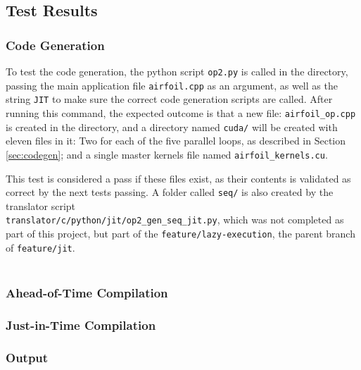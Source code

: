 \subsection{Test Results}

\subsubsection{Code Generation}
To test the code generation, the python script \verb|op2.py| is called in the directory, passing the main application file \verb|airfoil.cpp| as an argument, as well as the string \verb|JIT| to make sure the correct code generation scripts are called.
\noindent After running this command, the expected outcome is that a new file: \verb|airfoil_op.cpp| is created in the directory, and a directory named \verb|cuda/| will be created with eleven files in it: Two for each of the five parallel loops, as described in Section \ref{sec:codegen}; and a single master kernels file named \verb|airfoil_kernels.cu|.
\par
This test is considered a pass if these files exist, as their contents is validated as correct by the next tests passing. A folder called \verb|seq/| is also created by the translator script\\
 \verb|translator/c/python/jit/op2_gen_seq_jit.py|, which was not completed as part of this project, but part of the \verb|feature/lazy-execution|, the parent branch of \verb|feature/jit|.
 \\\\
 \setlength{\fboxsep}{1em}

\subsubsection{Ahead-of-Time Compilation}


\subsubsection{Just-in-Time Compilation}

\subsubsection{Output}

